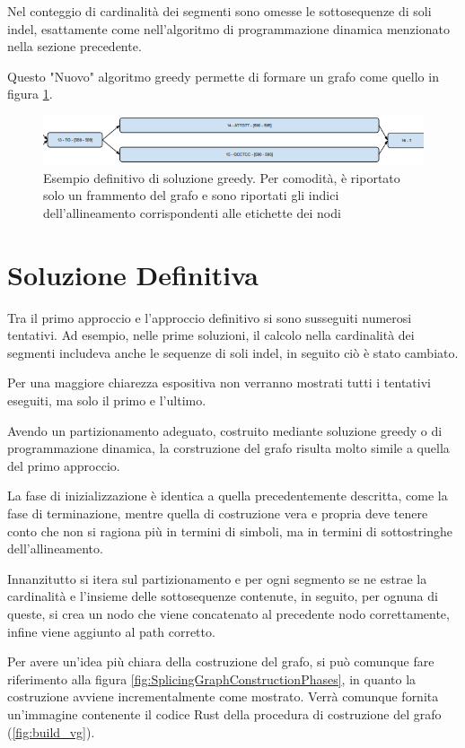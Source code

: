 Nel conteggio di cardinalità dei segmenti sono omesse le sottosequenze di soli indel, esattamente come nell'algoritmo di programmazione dinamica menzionato nella sezione precedente.

Questo "Nuovo" algoritmo greedy permette di formare un grafo come quello in figura \ref{fig:greedy_definitivo}.

\begin{figure}[ht]
    \centering
    \includegraphics[scale=0.9]{images/greedy2.PNG}
    \caption{Esempio definitivo di soluzione greedy. Per comodità, è riportato solo un frammento del grafo e sono riportati gli indici dell'allineamento corrispondenti alle etichette dei nodi}
    \label{fig:greedy_definitivo}
\end{figure}

\newpage

\section{Soluzione Definitiva}
Tra il primo approccio e l'approccio definitivo si sono susseguiti numerosi tentativi. Ad esempio, nelle prime soluzioni, il calcolo nella cardinalità dei segmenti includeva anche le sequenze di soli indel, in seguito ciò è stato cambiato. 

Per una maggiore chiarezza espositiva non verranno mostrati tutti i tentativi eseguiti, ma solo il primo e l'ultimo.

Avendo un partizionamento adeguato, costruito mediante soluzione greedy o di programmazione dinamica, la corstruzione del grafo risulta molto simile a quella del primo approccio. 

La fase di inizializzazione è identica a quella precedentemente descritta, come la fase di terminazione, mentre quella di costruzione vera e propria deve tenere conto che non si ragiona più in termini di simboli, ma in termini di sottostringhe dell'allineamento. 

Innanzitutto si itera sul partizionamento e per ogni segmento se ne estrae la cardinalità e l'insieme delle sottosequenze contenute, in seguito, per ognuna di queste, si crea un nodo che viene concatenato al precedente nodo correttamente, infine viene aggiunto al path corretto.

Per avere un'idea più chiara della costruzione del grafo, si può comunque fare riferimento alla figura \ref{fig:SplicingGraphConstructionPhases}, in quanto la costruzione avviene incrementalmente come mostrato. Verrà comunque fornita un'immagine contenente il codice Rust della procedura di costruzione del grafo (\ref{fig:build_vg}).

